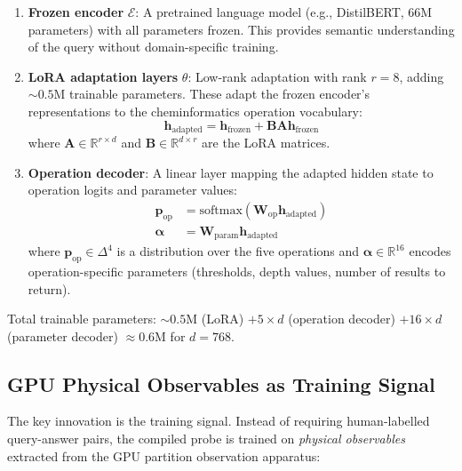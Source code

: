 \documentclass[11pt,twocolumn,a4paper]{article}
\theoremstyle{definition}
\theoremstyle{remark}
\newcommand{\Real}{\mathbb{R}}
\begin{document}
\begin{enumerate}[nosep]
\item \textbf{Frozen encoder} $\mathcal{E}$: A pretrained language model (e.g., DistilBERT, 66M parameters) with all parameters frozen. This provides semantic understanding of the query without domain-specific training.

\item \textbf{LoRA adaptation layers} $\theta$: Low-rank adaptation \citep{hu2022} with rank $r = 8$, adding $\sim 0.5$M trainable parameters. These adapt the frozen encoder's representations to the cheminformatics operation vocabulary:
\begin{equation}
\mathbf{h}_{\mathrm{adapted}} = \mathbf{h}_{\mathrm{frozen}} + \mathbf{B}\mathbf{A}\mathbf{h}_{\mathrm{frozen}}
\label{eq:lora}
\end{equation}
where $\mathbf{A} \in \Real^{r \times d}$ and $\mathbf{B} \in \Real^{d \times r}$ are the LoRA matrices.

\item \textbf{Operation decoder}: A linear layer mapping the adapted hidden state to operation logits and parameter values:
\begin{align}
\mathbf{p}_{\mathrm{op}} &= \mathrm{softmax}(\mathbf{W}_{\mathrm{op}} \mathbf{h}_{\mathrm{adapted}}) \label{eq:op_logits} \\
\boldsymbol{\alpha} &= \mathbf{W}_{\mathrm{param}} \mathbf{h}_{\mathrm{adapted}} \label{eq:param_decode}
\end{align}
where $\mathbf{p}_{\mathrm{op}} \in \Delta^4$ is a distribution over the five operations and $\boldsymbol{\alpha} \in \Real^{16}$ encodes operation-specific parameters (thresholds, depth values, number of results to return).
\end{enumerate}

Total trainable parameters: $\sim 0.5$M (LoRA) $+ 5 \times d$ (operation decoder) $+ 16 \times d$ (parameter decoder) $\approx 0.6$M for $d = 768$.

\subsection{GPU Physical Observables as Training Signal}

The key innovation is the training signal. Instead of requiring human-labelled query-answer pairs, the compiled probe is trained on \emph{physical observables} extracted from the GPU partition observation apparatus:
\end{document}
